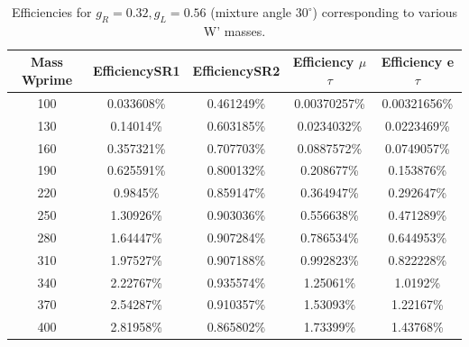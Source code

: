 \begin{table}[htb]
  \centering
  \begin{tabular}{|ccccc|}
    \hline 
    Mass Wprime & EfficiencySR1 & EfficiencySR2 & Efficiency $\mu$$\tau$ & Efficiency e $\tau$ \\
    \hline 
    100& 0.033608\%& 0.461249\%& 0.00370257\%& 0.00321656\%\\ 
    130& 0.14014\%& 0.603185\%& 0.0234032\%& 0.0223469\%\\ 
    160& 0.357321\%& 0.707703\%& 0.0887572\%& 0.0749057\%\\ 
    190& 0.625591\%& 0.800132\%& 0.208677\%& 0.153876\%\\ 
    220& 0.9845\%& 0.859147\%& 0.364947\%& 0.292647\%\\ 
    250& 1.30926\%& 0.903036\%& 0.556638\%& 0.471289\%\\ 
    280& 1.64447\%& 0.907284\%& 0.786534\%& 0.644953\%\\ 
    310& 1.97527\%& 0.907188\%& 0.992823\%& 0.822228\%\\ 
    340& 2.22767\%& 0.935574\%& 1.25061\%& 1.0192\%\\ 
    370& 2.54287\%& 0.910357\%& 1.53093\%& 1.22167\%\\ 
    400& 2.81958\%& 0.865802\%& 1.73399\%& 1.43768\%\\ 
    \hline
  \end{tabular}
  \caption{Efficiencies for  $ g_R=0.32, g_L=0.56  $ (mixture angle $30^\circ$) corresponding to various W' masses. \label{eff-mix30} }
\end{table}

